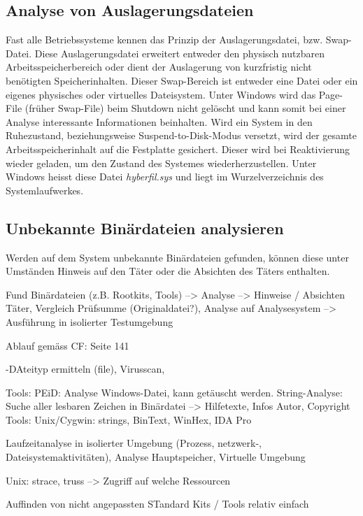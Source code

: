 \subsection{Analyse von Auslagerungsdateien}
Fast alle Betriebssysteme kennen das Prinzip der Auslagerungsdatei, bzw. Swap-Datei. Diese Auslagerungsdatei erweitert entweder den physisch nutzbaren Arbeitsspeicherbereich oder dient der Auslagerung von kurzfristig nicht benötigten Speicherinhalten. Dieser Swap-Bereich ist entweder eine Datei oder ein eigenes physisches oder virtuelles Dateisystem. Unter Windows wird das Page-File (früher Swap-File) beim Shutdown nicht gelöscht und kann somit bei einer Analyse interessante Informationen beinhalten. Wird ein System in den Ruhezustand, beziehungsweise Suspend-to-Disk-Modus versetzt, wird der gesamte Arbeitsspeicherinhalt auf die Festplatte gesichert. Dieser wird bei Reaktivierung wieder geladen, um den Zustand des Systemes wiederherzustellen. Unter Windows heisst diese Datei \textit{hyberfil.sys} und liegt im Wurzelverzeichnis des Systemlaufwerkes.




\subsection{Unbekannte Binärdateien analysieren}
Werden auf dem System unbekannte Binärdateien gefunden, können diese unter Umständen Hinweis auf den Täter oder die Absichten des Täters enthalten. 

Fund Binärdateien (z.B. Rootkits, Tools) --> Analyse --> Hinweise / Absichten Täter, Vergleich Prüfsumme (Originaldatei?), Analyse auf Analysesystem --> Ausführung in isolierter Testumgebung

Ablauf gemäss CF: Seite 141

-DAteityp ermitteln (file), Virusscan, 

Tools: PEiD: Analyse Windows-Datei, kann getäuscht werden.
String-Analyse: Suche aller lesbaren Zeichen in Binärdatei --> Hilfetexte, Infos Autor, Copyright
Tools: Unix/Cygwin: strings, BinText, WinHex, IDA Pro

Laufzeitanalyse in isolierter Umgebung (Prozess, netzwerk-, Dateisystemaktivitäten), Analyse Hauptspeicher, Virtuelle Umgebung

Unix: strace, truss --> Zugriff auf welche Ressourcen

Auffinden von nicht angepassten STandard Kits / Tools relativ einfach

